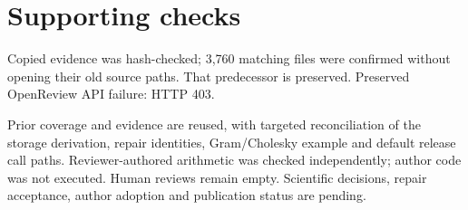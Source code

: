 \documentclass[10pt]{article}
\begin{document}
\section*{Supporting checks}
Copied evidence was hash-checked; 3,760 matching files were confirmed without opening their old source paths. That predecessor is preserved. Preserved OpenReview API failure: HTTP 403.\par
Prior coverage and evidence are reused, with targeted reconciliation of the storage derivation, repair identities, Gram/Cholesky example and default release call paths. Reviewer-authored arithmetic was checked independently; author code was not executed. Human reviews remain empty. Scientific decisions, repair acceptance, author adoption and publication status are pending.\par
\end{document}
